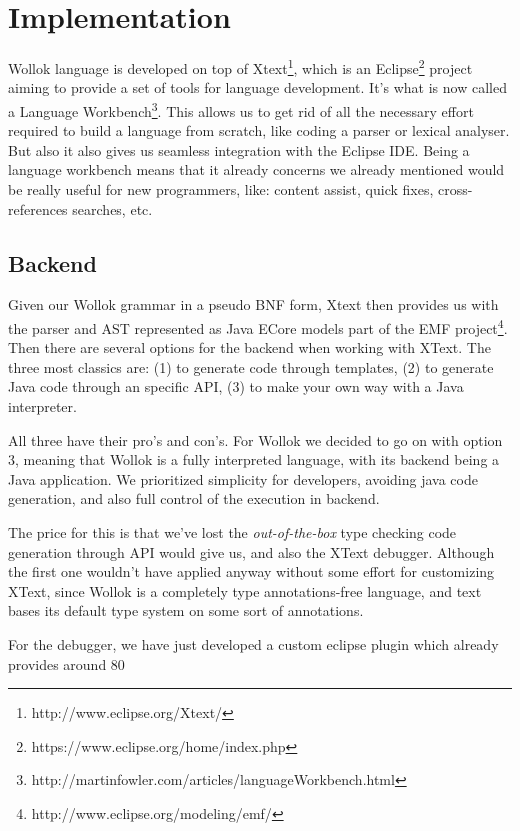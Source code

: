 \section{Implementation}
\label{sec:implementation}

Wollok language is developed on top of Xtext\footnote{http://www.eclipse.org/Xtext/}, which is an Eclipse\footnote{https://www.eclipse.org/home/index.php} project aiming to provide a set of tools for language development. It’s what is now called a Language Workbench\footnote{http://martinfowler.com/articles/languageWorkbench.html}.
This allows us to get rid of all the necessary effort required to build a language from scratch, like coding a parser or lexical analyser. But also it also gives us seamless integration with the Eclipse IDE. Being a language workbench means that it already concerns we already mentioned would be really useful for new programmers, like: content assist, quick fixes, cross-references searches, etc.

\subsection{Backend}

Given our Wollok grammar in a pseudo BNF form, Xtext then provides us with the parser and AST represented as Java ECore models part of the EMF project\footnote{http://www.eclipse.org/modeling/emf/}. Then there are several options for the backend when working with XText. The three most classics are: (1) to generate code through templates, (2) to generate Java code through an specific API, (3) to make your own way with a Java interpreter.

All three have their pro’s and con’s. For Wollok we decided to go on with option 3, meaning that Wollok is a fully interpreted language, with its backend being a Java application.
We prioritized simplicity for developers, \eg avoiding java code generation, and also full control of the execution in backend. 

The price for this is that we’ve lost the \emph{out-of-the-box} type checking code generation through API would give us, and also the XText debugger.
Although the first one wouldn’t have applied anyway without some effort for customizing XText, since Wollok is a completely type annotations-free language, and text bases its default type system on some sort of annotations.

For the debugger, we have just developed a custom eclipse plugin which already provides around 80%

